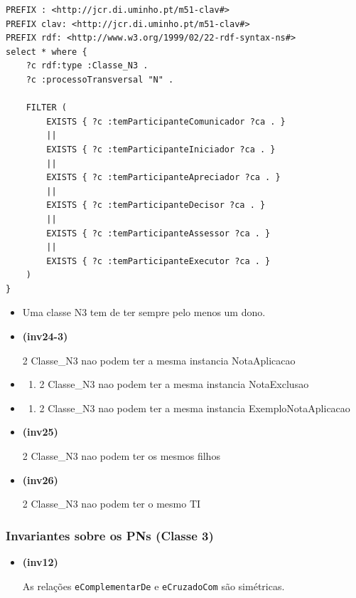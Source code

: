 \documentclass[tikz,runningheads,a4paper]{llncs}
\begin{document}
\begin{subappendices}
\begin{lstlisting}[language=sparql, frame=single, basicstyle=\scriptsize]
PREFIX : <http://jcr.di.uminho.pt/m51-clav#>
PREFIX clav: <http://jcr.di.uminho.pt/m51-clav#>
PREFIX rdf: <http://www.w3.org/1999/02/22-rdf-syntax-ns#>
select * where {
    ?c rdf:type :Classe_N3 .
    ?c :processoTransversal "N" .
    
    FILTER (
        EXISTS { ?c :temParticipanteComunicador ?ca . }
        ||
        EXISTS { ?c :temParticipanteIniciador ?ca . }
        ||
        EXISTS { ?c :temParticipanteApreciador ?ca . }
        ||
        EXISTS { ?c :temParticipanteDecisor ?ca . }
        ||
        EXISTS { ?c :temParticipanteAssessor ?ca . }
        ||
        EXISTS { ?c :temParticipanteExecutor ?ca . }
    )
}
\end{lstlisting}

\begin{itemize}
\item
  Uma classe N3 tem de ter sempre pelo menos um dono.
\item
  \hypertarget{inv24-3}{\textbf{(inv24-3)}} 2 Classe\_N3 nao podem ter a mesma instancia
  NotaAplicacao
\item
  \begin{enumerate}
  \def\labelenumi{(\arabic{enumi})}
  \setcounter{enumi}{24}
  \tightlist
  \item
    2 Classe\_N3 nao podem ter a mesma instancia NotaExclusao
  \end{enumerate}
\item
  \begin{enumerate}
  \def\labelenumi{(\arabic{enumi})}
  \setcounter{enumi}{24}
  \tightlist
  \item
    2 Classe\_N3 nao podem ter a mesma instancia ExemploNotaAplicacao
  \end{enumerate}
\item
  \hypertarget{inv25}{\textbf{(inv25)}} 2 Classe\_N3 nao podem ter os mesmos filhos
\item
  \hypertarget{inv26}{\textbf{(inv26)}} 2 Classe\_N3 nao podem ter o mesmo TI
\end{itemize}

\hypertarget{invariantes-sobre-os-pns-classe-3}{%
\subsubsection{Invariantes sobre os PNs (Classe
3)}\label{invariantes-sobre-os-pns-classe-3}}

\begin{itemize}
\tightlist
\item
  \hypertarget{inv12}{\textbf{(inv12)}} As relações \texttt{eComplementarDe} e
  \texttt{eCruzadoCom} são simétricas.
\end{itemize}


\end{subappendices}
\end{document}
